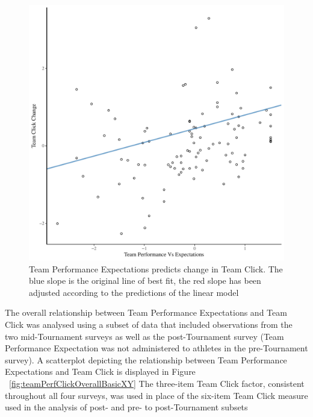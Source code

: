 
    
    


    \begin{figure}[htbp]
      \centering
    \includegraphics[scale=.5]{images/teamPerfClickDeltaModelSlope.pdf}
      \caption{Team Performance Expectations predicts change in Team Click. The blue slope is the original line of best fit, the red slope has been adjusted according to the predictions of the linear model}
      \label{fig:teamPerfClickDeltaModelSlope}
    \end{figure}




The overall relationship between Team Performance Expectations and Team Click was analysed using a subset of data that included observations from the two mid-Tournament surveys as well as the post-Tournament survey (Team Performance Expectation was not administered to athletes in the pre-Tournament survey).  A scatterplot depicting the relationship between Team Performance Expectations and Team Click is displayed in Figure ~\ref{fig:teamPerfClickOverallBasicXY} The three-item Team Click factor, consistent throughout all four surveys, was used in place of the six-item Team Click measure used in the analysis of post- and pre- to post-Tournament subsets

